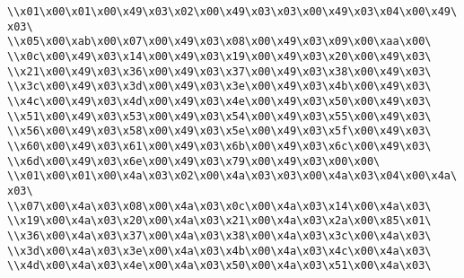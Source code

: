\verb|\\x01\x00\x01\x00\x49\x03\x02\x00\x49\x03\x03\x00\x49\x03\x04\x00\x49\x03\|\newline
\verb|\\x05\x00\xab\x00\x07\x00\x49\x03\x08\x00\x49\x03\x09\x00\xaa\x00\|\newline
\verb|\\x0c\x00\x49\x03\x14\x00\x49\x03\x19\x00\x49\x03\x20\x00\x49\x03\|\newline
\verb|\\x21\x00\x49\x03\x36\x00\x49\x03\x37\x00\x49\x03\x38\x00\x49\x03\|\newline
\verb|\\x3c\x00\x49\x03\x3d\x00\x49\x03\x3e\x00\x49\x03\x4b\x00\x49\x03\|\newline
\verb|\\x4c\x00\x49\x03\x4d\x00\x49\x03\x4e\x00\x49\x03\x50\x00\x49\x03\|\newline
\verb|\\x51\x00\x49\x03\x53\x00\x49\x03\x54\x00\x49\x03\x55\x00\x49\x03\|\newline
\verb|\\x56\x00\x49\x03\x58\x00\x49\x03\x5e\x00\x49\x03\x5f\x00\x49\x03\|\newline
\verb|\\x60\x00\x49\x03\x61\x00\x49\x03\x6b\x00\x49\x03\x6c\x00\x49\x03\|\newline
\verb|\\x6d\x00\x49\x03\x6e\x00\x49\x03\x79\x00\x49\x03\x00\x00\|\newline
\verb|\\x01\x00\x01\x00\x4a\x03\x02\x00\x4a\x03\x03\x00\x4a\x03\x04\x00\x4a\x03\|\newline
\verb|\\x07\x00\x4a\x03\x08\x00\x4a\x03\x0c\x00\x4a\x03\x14\x00\x4a\x03\|\newline
\verb|\\x19\x00\x4a\x03\x20\x00\x4a\x03\x21\x00\x4a\x03\x2a\x00\x85\x01\|\newline
\verb|\\x36\x00\x4a\x03\x37\x00\x4a\x03\x38\x00\x4a\x03\x3c\x00\x4a\x03\|\newline
\verb|\\x3d\x00\x4a\x03\x3e\x00\x4a\x03\x4b\x00\x4a\x03\x4c\x00\x4a\x03\|\newline
\verb|\\x4d\x00\x4a\x03\x4e\x00\x4a\x03\x50\x00\x4a\x03\x51\x00\x4a\x03\|\newline

